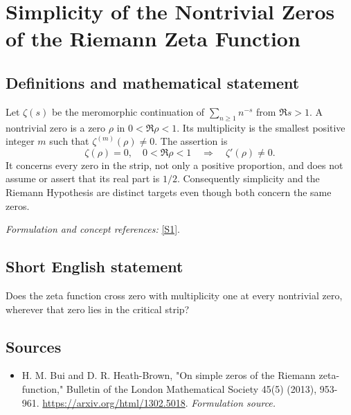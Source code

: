 \documentclass[11pt]{article}
\begin{document}
\section*{\texorpdfstring{Simplicity of the Nontrivial Zeros of the Riemann Zeta Function}{Simplicity of the Nontrivial Zeros of the Riemann Zeta Function}}\label{30006766}
\subsection{Definitions and mathematical statement}
Let $\zeta(s)$ be the meromorphic continuation of $\sum_{n\ge1}n^{-s}$ from $\Re s>1$. A nontrivial zero is a zero $\rho$ in $0<\Re\rho<1$. Its multiplicity is the smallest positive integer $m$ such that $\zeta^{(m)}(\rho)\ne0$. The assertion is
\[
 \zeta(\rho)=0,\quad0<\Re\rho<1\quad\Longrightarrow\quad\zeta'(\rho)\ne0.
\]
It concerns every zero in the strip, not only a positive proportion, and does not assume or assert that its real part is $1/2$. Consequently simplicity and the Riemann Hypothesis are distinct targets even though both concern the same zeros.
\par\smallskip\textit{Formulation and concept references:} \href{https://arxiv.org/html/1302.5018}{[S1]}.

\subsection{Short English statement}
Does the zeta function cross zero with multiplicity one at every nontrivial zero, wherever that zero lies in the critical strip?
\subsection{Sources}
\begin{itemize}
\item[S1]H. M. Bui and D. R. Heath-Brown, "On simple zeros of the Riemann zeta-function," Bulletin of the London Mathematical Society 45(5) (2013), 953-961.
\url{https://arxiv.org/html/1302.5018}.
\textit{Formulation source.}
\end{itemize}
\end{document}

